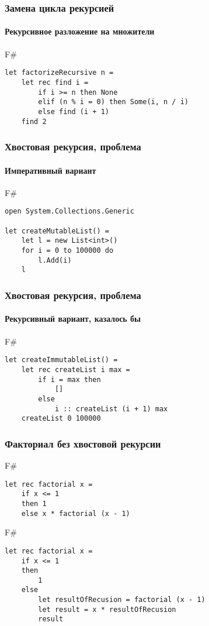 \documentclass[xetex,mathserif,serif]{beamer}
\begin{document}
	\begin{frame}[fragile]
		\frametitle{Замена цикла рекурсией}
		\framesubtitle{Рекурсивное разложение на множители}
		\begin{exampleblock}{F\#}
			\begin{lstlisting}
let factorizeRecursive n =
    let rec find i =
        if i >= n then None
        elif (n % i = 0) then Some(i, n / i)
        else find (i + 1)
    find 2
\end{lstlisting}
\end{exampleblock}
		
\end{frame}

\begin{frame}[fragile]
	\frametitle{Хвостовая рекурсия, проблема}
	\framesubtitle{Императивный вариант}
	\begin{exampleblock}{F\#}
		\begin{lstlisting}
open System.Collections.Generic

let createMutableList() =
    let l = new List<int>()
    for i = 0 to 100000 do
        l.Add(i)
    l
\end{lstlisting}
\end{exampleblock}
	
\end{frame}

\begin{frame}[fragile]
	\frametitle{Хвостовая рекурсия, проблема}
	\framesubtitle{Рекурсивный вариант, казалось бы}
	\begin{exampleblock}{F\#}
		\begin{lstlisting}
let createImmutableList() =
    let rec createList i max =
        if i = max then
            []	
        else
            i :: createList (i + 1) max
    createList 0 100000
\end{lstlisting}
\end{exampleblock}
	
\end{frame}

\begin{frame}[fragile]
	\frametitle{Факториал без хвостовой рекурсии}
	\begin{exampleblock}{F\#}
		\begin{lstlisting}
let rec factorial x =
    if x <= 1
    then 1 
    else x * factorial (x - 1)
\end{lstlisting}
\end{exampleblock}
	
	\begin{exampleblock}{F\#}
		\begin{lstlisting}
let rec factorial x =
    if x <= 1
    then
        1
    else
        let resultOfRecusion = factorial (x - 1)
        let result = x * resultOfRecusion
        result
\end{lstlisting}
\end{exampleblock}
	
\end{frame}
\end{document}
